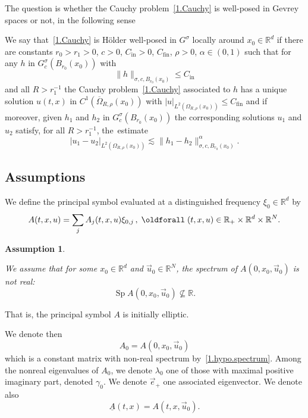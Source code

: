 \documentclass[AHL,Unicode,longabstracts,published]{cedram}
\theoremstyle{plain}
\newtheorem{hypo}[cdrthm]{Assumption} }
\newcommand*\R{{\mathbb R}}
\newcommand{\alf}{\alpha}%
\newcommand*\g{\gamma}
\newcommand*\und{\underline}
\DeclareMathOperator{\Sp}{Sp}
\renewcommand*{\forall}{\mathrel{\oldforall}}
\begin{document}
The question is whether the Cauchy problem~\eqref{1.Cauchy} is well-posed in Gevrey spaces or not, in the following sense

\begin{defi}\label{1.defi.well_posedness}
We say that~\eqref{1.Cauchy} is H\"older well-posed in $G^{\sigma}$ locally around $x_0\in\R^{d}$ if there are constants $r_0 > r_1 >0$, $c>0$, $C_{\text{in}}>0$, $C_{\text{fin}}$, $\rho>0$, $\alf\in(0,1)$ such that for any $h$ in $G^{\sigma}_{c}(B_{r_0}(x_0))$ with
\[
\|h\|_{\sigma,c,B_{r_0}(x_0)} \leq C_{\text{in}}
\]
and all $R>r_1^{-1}$ the Cauchy problem~\eqref{1.Cauchy} associated to $h$ has a unique solution $u(t,x)$ in $C^{1}(\overline{\Omega}_{R,\rho}(x_0))$ with $|u|_{L^{2}(\Omega_{R,\rho}(x_0))} \leq C_{\text{fin}}$ and if moreover, given $h_1$ and $h_2$ in $G^{\sigma}_{c}(B_{r_0}(x_0))$ the corresponding solutions $u_1$ and $u_2$ satisfy, for all $R>r_1^{-1}$, the~estimate
\[
|u_1 - u_2|_{L^{2}(\Omega_{R,\rho}(x_0))} \lesssim\|h_1 - h_2\|_{\sigma,c,B_{r_0}(x_0)}^{\alf}.
\]
\end{defi}



\subsection{Assumptions}\label{1.subsection.normal}


We define the principal symbol evaluated at a distinguished frequency $ \xi_0\in\R^{d}$ by
\begin{equation}\label{1.def.A}
A(t,x,u) = \sum_{j} A_j(t,x,u)\xi_{0,j} \,, \; \forall (t,x,u) \in \R_{+}\times\R^{d}\times\R^{N}.
\end{equation}

\begin{hypo}\label{1.hypo.1}

We assume that for some $x_0\in\R^{d}$ and $\vec{u}_0\in\R^{N}$, the spectrum of $A(0,x_0,\vec{u}_0)$ is not real:
\begin{equation}\label{1.hypo.spectrum}
{\Sp} A(0,x_0,\vec{u}_0) \not\subseteq \R.
\end{equation}
\end{hypo}

That is, the principal symbol $A$ is initially elliptic.

\begin{notation}\label{1.notation.elli}
We denote then
\begin{equation}\label{1.def.A_0}
A_0 = A(0,x_0,\vec{u}_0)
\end{equation}
which is a constant matrix with non-real spectrum by~\eqref{1.hypo.spectrum}. Among the nonreal eigenvalues of $A_0$, we denote $\lambda_0$ one of those with maximal positive imaginary part, denoted $\g_0$. We denote $\vec{e}_{+}$ one associated eigenvector. We denote also
\begin{equation}\label{1.def.undA}
\und{A}(t,x) = A(t,x,\vec{u}_0).
\end{equation}
\end{notation}
\end{document}
